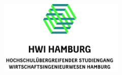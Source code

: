 
\begin{titlepage}
\sffamily\bfseries %
\doublespacing
	

\begin{minipage}[l][7.5cm][t]{\textwidth}
	\begin{center}
		\includegraphics[height=3.5cm]{_basic_settings_dont_touch/hwi-logo.jpg} \\	
	\end{center}
\end{minipage}

\begin{minipage}[l][5.0cm][t]{\textwidth}
	\begin{center}


\end{center}
\end{minipage}
\end{titlepage}
